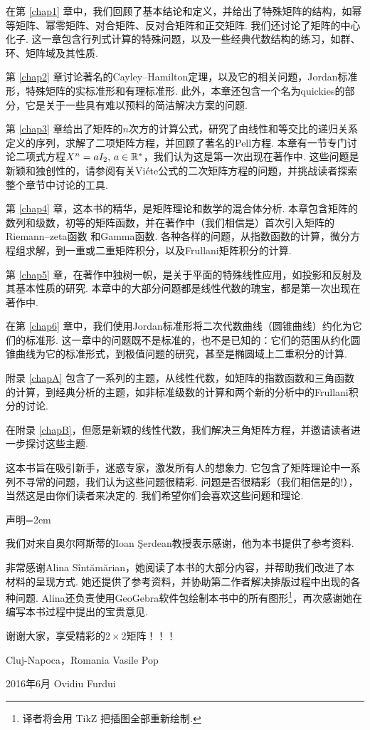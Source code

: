在第 \ref{chap1} 章中，我们回顾了基本结论和定义，并给出了特殊矩阵的结构，如幂等矩阵、幂零矩阵、对合矩阵、反对合矩阵和正交矩阵. 我们还讨论了矩阵的中心化子. 这一章包含行列式计算的特殊问题，以及一些经典代数结构的练习，如群、环、矩阵域及其性质.

第 \ref{chap2} 章讨论著名的Cayley--Hamilton定理，以及它的相关问题，Jordan标准形，特殊矩阵的实标准形和有理标准形. 此外，本章还包含一个名为quickies的部分，它是关于一些具有难以预料的简洁解决方案的问题.

第 \ref{chap3} 章给出了矩阵的$n$次方的计算公式，研究了由线性和等交比的递归关系定义的序列，求解了二项矩阵方程，并回顾了著名的Pell方程. 本章有一节专门讨论二项式方程$X^n=aI_2,\,a\in\mathbb R^\ast$，我们认为这是第一次出现在著作中. 这些问题是新颖和独创性的，请参阅有关Vi\'ete公式的二次矩阵方程的问题，并挑战读者探索整个章节中讨论的工具.

第 \ref{chap4} 章，{\hyds 这本书的精华}，是矩阵理论和数学的混合体分析. 本章包含矩阵的数列和级数，初等的矩阵函数，并在著作中（我们相信是）首次引入矩阵的{\hyds Riemann--zeta函数} 和{\hyds Gamma函数}. 各种各样的问题，从指数函数的计算，微分方程组求解，到一重或二重矩阵积分，以及{\hyds Frullani矩阵积分}的计算.

第 \ref{chap5} 章，在著作中{\hyds 独树一帜}，是关于平面的特殊线性应用，如投影和反射及其基本性质的研究. 本章中的大部分问题都是线性代数的瑰宝，都是第一次出现在著作中.

在第 \ref{chap6} 章中，我们使用Jordan标准形将二次代数曲线（圆锥曲线）约化为它们的标准形. 这一章中的问题既不是标准的，也不是已知的：它们的范围从约化圆锥曲线为它的标准形式，到极值问题的研究，甚至是椭圆域上二重积分的计算.

附录 \ref{chapA} 包含了一系列的主题，从线性代数，如矩阵的指数函数和三角函数的计算，到经典分析的主题，如非标准级数的计算和两个新的分析中的Frullani积分的讨论.

在附录 \ref{chapB}，但愿是{\kaishu 新颖的线性代数}，我们解决三角矩阵方程，并邀请读者进一步探讨这些主题.

{\kaishu 这本书旨在吸引新手，迷惑专家，激发所有人的想象力}. 它包含了矩阵理论中一系列不寻常的问题，我们认为这些问题很{\kaishu 精彩}. 问题是否很精彩（我们相信是的!），当然这是由你们读者来决定的. 我们希望你们会喜欢这些问题和理论.

\begin{mybox}
{\hyds 声明}\parindent=2em

  我们对来自奥尔阿斯蒂的Ioan \c Serdean教授表示感谢，他为本书提供了参考资料.

  非常感谢Alina S\^int\u am\u arian，她阅读了本书的大部分内容，并帮助我们改进了本材料的呈现方式. 她还提供了参考资料，并协助第二作者解决排版过程中出现的各种问题. Alina还{\kaishu 负责}使用GeoGebra软件包绘制本书中的所有图形\footnote{译者将会用 {\color{red}TikZ} 把插图全部重新绘制.}，再次{\kaishu 感谢}她在编写本书过程中提出的宝贵意见.
\end{mybox}

谢谢大家，享受精彩的$2\times2$矩阵！！！
\vspace*{1cm}

\noindent Cluj-Napoca，\hfill Romania Vasile Pop

\noindent2016年6月 \hfill Ovidiu Furdui










\clearpage
